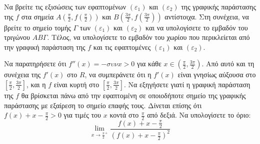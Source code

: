 \begin{alist}
    \item Να βρείτε τις εξισώσεις των εφαπτομένων $(\varepsilon_1)$ και $(\varepsilon_2)$ της γραφικής παράστασης της $f$ στα σημεία $A({\frac{\pi}{2}}, f({\frac{\pi}{2}}))$ και $B({\frac{3\pi}{2}}, f({\frac{3\pi}{2}}))$ αντίστοιχα.
    Στη συνέχεια, να βρείτε το σημείο τομής $\Gamma$ των $(\varepsilon_1)$ και $(\varepsilon_2)$ και να υπολογίσετε το εμβαδόν του τριγώνου $AB\Gamma$.
    Τέλος, να υπολογίσετε το εμβαδόν του χωρίου που περικλείεται από την γραφική παράσταση της $f$ και τις εφαπτομένες $(\varepsilon_1)$ και $(\varepsilon_2)$.

    \item Να παρατηρήσετε ότι $f''(x) = -\sigma\upsilon\nu x > 0$ για κάθε $x \in ({\frac{\pi}{2}}, {\frac{3\pi}{2}})$. Από αυτό και τη συνέχεια της $f'(x)$ στο $R$, να συμπεράνετε ότι η $f'(x)$ είναι γνησίως αύξουσα στο $[{\frac{\pi}{2}}, {\frac{3\pi}{2}}]$, και η $f$ είναι κυρτή στο $[{\frac{\pi}{2}}, {\frac{3\pi}{2}}]$.
    Να εξηγήσετε γιατί η γραφική παράσταση της $f$ θα βρίσκεται πάνω από την εφαπτομένη σε οποιοδήποτε σημείο της γραφικής παράστασης με εξαίρεση το σημείο επαφής τους.
    Δίνεται επίσης ότι $f(x) + x - {\frac{\pi}{2}} > 0$ για τιμές του $x$ κοντά στο ${\frac{\pi}{2}}$ από δεξιά.
    Να υπολογίσετε το όριο:
    \[ \lim_{x \to {\frac{\pi}{2}}^+} {\frac{f(x) + x - {\frac{\pi}{2}}}{(f(x) + x - {\frac{\pi}{2}})^2}} \]
\end{alist}